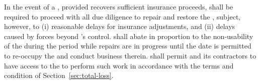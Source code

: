 In the event of a \partialLoss, provided \lessor recovers sufficient insurance proceeds, \lessor shall be required to proceed with all due diligence to repair and restore the \premises, subject, however, to (i) reasonable delays for insurance adjustments, and (ii) delays caused by forces beyond \lessor's control. \monthlyRent shall abate in proportion to the non-usability of the \premises during the period while repairs are in progress until the date \lessee is permitted to re-occupy the \premises and conduct business therein. \lessee shall permit \lessor and its contractors to have access to the \premises to perform such work in accordance with the terms and condition of Section~\ref{sec:total-loss}.
